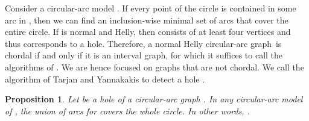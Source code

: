 \documentclass[10pt]{article}
\newtheorem{proposition}[theorem]{Proposition}
\newcommand{\nhcag}{normal Helly circular-arc graph}
\begin{document}
Consider a circular-arc model .  If every point of the circle
is contained in some arc in , then we can find an
inclusion-wise minimal set  of arcs that cover the entire circle.
If  is normal and Helly, then  consists of at least four
vertices and thus corresponds to a hole.  Therefore, a \nhcag\  is
chordal if and only if it is an interval graph, for which it suffices
to call the algorithms of
\cite{kratsch-06-certifying-interval-and-permutation,lindzey-13-find-forbidden-subgraphs}.
We are hence focused on graphs that are not chordal.  We call the
algorithm of Tarjan and Yannakakis
\cite{tarjan-84-chordal-recognition} to detect a hole .
\begin{proposition}\label{lem:fundamental}
  Let  be a hole of a circular-arc graph .  In any circular-arc
  model of , the union of arcs for  covers the whole circle.
  In other words, .
\end{proposition}
\end{document}
